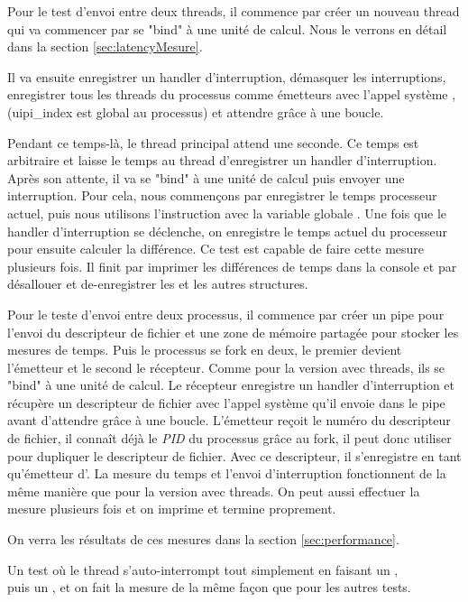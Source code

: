 Pour le test d'envoi entre deux threads, il commence par créer un nouveau thread qui va commencer par se "bind" à une unité de calcul.
Nous le verrons en détail dans la section \ref{sec:latencyMesure}.

Il va ensuite enregistrer un handler d'interruption, démasquer les interruptions, enregistrer tous les threads du processus comme émetteurs avec l'appel système ,\\
(uipi_index est global au processus) et attendre grâce à une boucle.

Pendant ce temps-là, le thread principal attend une seconde.
Ce temps est arbitraire et laisse le temps au thread d'enregistrer un handler d'interruption.
Après son attente, il va se "bind" à une unité de calcul puis envoyer une interruption.
Pour cela, nous commençons par enregistrer le temps processeur actuel, puis nous utilisons l'instruction  avec la variable globale .
Une fois que le handler d'interruption se déclenche, on enregistre le temps actuel du processeur pour ensuite calculer la différence.
Ce test est capable de faire cette mesure plusieurs fois.
Il finit par imprimer les différences de temps dans la console et par désallouer et de-enregistrer les \uintr{} et les autres structures.

Pour le teste d'envoi entre deux processus, il commence par créer un pipe pour l'envoi du descripteur de fichier et une zone de mémoire partagée pour stocker les mesures de temps.
Puis le processus se fork en deux, le premier devient l'émetteur et le second le récepteur.
Comme pour la version avec threads, ils se "bind" à une unité de calcul.
Le récepteur enregistre un handler d'interruption et récupère un descripteur de fichier avec l'appel système  qu'il envoie dans le pipe avant d'attendre grâce à une boucle.
L'émetteur reçoit le numéro du descripteur de fichier, il connaît déjà le \emph{PID} du processus grâce au fork,
il peut donc utiliser  pour dupliquer le descripteur de fichier.
Avec ce descripteur, il s'enregistre en tant qu'émetteur d'\uintr{}.
La mesure du temps et l'envoi d'interruption fonctionnent de la même manière que pour la version avec threads.
On peut aussi effectuer la mesure plusieurs fois et on imprime et termine proprement.

On verra les résultats de ces mesures dans la section \ref{sec:performance}.

Un test où le thread s'auto-interrompt tout simplement en faisant un ,\\
puis un , et on fait la mesure de la même façon que pour les autres tests.

